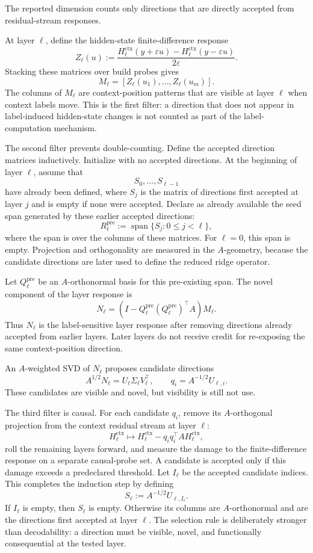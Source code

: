 \documentclass[11pt]{article}
\newcommand{\spanop}{\operatorname{span}}
\begin{document}
The reported dimension counts only directions that are directly accepted from residual-stream
responses.

At layer \(\ell\), define the hidden-state finite-difference response
\[
Z_\ell(u)
:=
\frac{
H_\ell^{\mathrm{ctx}}(y+\varepsilon u)-H_\ell^{\mathrm{ctx}}(y-\varepsilon u)
}{2\varepsilon}.
\]
Stacking these matrices over build probes gives
\[
M_\ell=[Z_\ell(u_1),\ldots,Z_\ell(u_m)].
\]
The columns of \(M_\ell\) are context-position patterns that are visible at layer \(\ell\) when
context labels move. This is the first filter: a direction that does not appear in label-induced
hidden-state changes is not counted as part of the label-computation mechanism.

The second filter prevents double-counting. Define the accepted direction matrices inductively.
Initialize with no accepted directions. At the beginning of layer \(\ell\), assume that
\[
S_0,\ldots,S_{\ell-1}
\]
have already been defined, where \(S_j\) is the matrix of directions first accepted at layer \(j\)
and is empty if none were accepted. Declare as already available the seed span generated by these
earlier accepted directions:
\[
R_\ell^{\mathrm{pre}}
:=
\spanop\{S_j:0\le j<\ell\},
\]
where the span is over the columns of these matrices. For \(\ell=0\), this span is empty. Projection
and orthogonality are measured in the \(A\)-geometry, because the candidate directions are later used
to define the reduced ridge operator.

Let \(Q_\ell^{\mathrm{pre}}\) be an \(A\)-orthonormal basis for this pre-existing span. The novel
component of the layer response is
\[
N_\ell
=
\left(I-Q_\ell^{\mathrm{pre}}(Q_\ell^{\mathrm{pre}})^\top A\right)M_\ell.
\]
Thus \(N_\ell\) is the label-sensitive layer response after removing directions already accepted
from earlier layers. Later layers do not receive credit for re-exposing the same context-position
direction.

An \(A\)-weighted SVD of \(N_\ell\) proposes candidate directions
\[
A^{1/2}N_\ell=U_\ell\Sigma_\ell V_\ell^\top,
\qquad
q_i=A^{-1/2}U_{\ell,i}.
\]
These candidates are visible and novel, but visibility is still not use.

The third filter is causal. For each candidate \(q_i\), remove its \(A\)-orthogonal projection from
the context residual stream at layer \(\ell\):
\[
H_\ell^{\mathrm{ctx}}
\longmapsto
H_\ell^{\mathrm{ctx}}-q_iq_i^\top A H_\ell^{\mathrm{ctx}},
\]
roll the remaining layers forward, and measure the damage to the finite-difference response on a
separate causal-probe set. A candidate is accepted only if this damage exceeds a predeclared
threshold. Let \(I_\ell\) be the accepted candidate indices. This completes the induction step by
defining
\[
S_\ell:=A^{-1/2}U_{\ell,I_\ell}.
\]
If \(I_\ell\) is empty, then \(S_\ell\) is empty. Otherwise its columns are \(A\)-orthonormal and are
the directions first accepted at layer \(\ell\). The selection rule is deliberately stronger than
decodability: a direction must be visible, novel, and functionally consequential at the tested layer.
\end{document}
